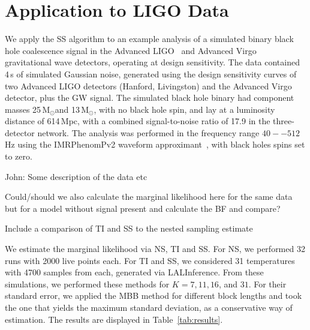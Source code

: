 \documentclass[aps,reprint,amsmath,amssymb,showpacs,showkeys]{revtex4-1}%
\newcommand{\cb}{ \color{blue}}
\newcommand{\Msun}{$\text{M}_{\odot}$}
\begin{document}


\section{Application to LIGO Data} \label{sec:LIGO}
We apply the SS algorithm to an example analysis of a simulated binary black hole
coalescence signal in the Advanced LIGO~\cite{0264-9381-32-7-074001} and Advanced Virgo~\cite{0264-9381-32-2-024001}
gravitational wave detectors, operating at design sensitivity.
The data contained 4\,s of simulated Gaussian noise, generated using the design
sensitivity curves of two Advanced LIGO detectors (Hanford, Livingston) and the Advanced Virgo detector,
plus the GW signal. The simulated black hole binary had component masses 25\,\Msun and 13\,\Msun,
with no black hole spin, and lay at a luminosity distance of 614\,Mpc, with a combined signal-to-noise ratio of 17.9 in the
three-detector network. The analysis was performed in the frequency range $40--512$\,Hz using the IMRPhenomPv2
waveform approximant~\cite{}, with black holes spins set to zero. 

{\cb John: Some description of the data etc


Could/should we also calculate the marginal likelihood here for the same data but for a model without signal present and calculate the BF and compare?

Include a comparison of TI and SS to the nested sampling estimate}

We estimate the marginal likelihood via NS, TI and SS.  For NS, we performed 32 runs with 2000 live points each.  For TI and SS, we considered 31 temperatures with 4700 samples from each, generated via LALInference.  From these simulations, we performed these methods for $K=7, 11, 16$, and $31$.  For their standard error, we applied the MBB method for different block lengths and took the one that yields the maximum standard deviation, as a conservative way of estimation. The results are displayed in Table~\ref{tab:results}.
\end{document}
